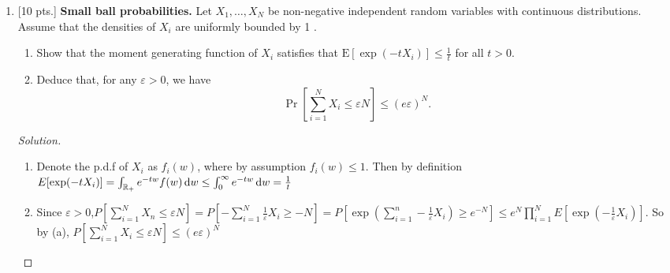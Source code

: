 \documentclass[12pt,letterpaper]{article}
\newenvironment{solution}{%
  \begin{proof}[Solution]$ $\par\nobreak\ignorespaces
}{%
  \end{proof}
}
\def \w{\boldsymbol{w}}
\def \x{\boldsymbol{x}}
\begin{document}
\begin{enumerate}
\begin{solution}
  Observe that
  \[\nm{\w_{(t+1)}}^{2}=\nm\{\w_{t}\}^{2}+2y_{t}\dual{\w_{t},\x_{t}}+\nm{x_{t}}^{2}\]
  So by selecting $\x_{t}\st \nm{x_{t}}=1,\dual{\w_{t},\x_{t}}$ (finding such a vector perpendicular to $\w_{t}$ is always possible as long as $d\geq 2$), then $\w_{t}$ grpws by exactly 1 at each iteration. In this way, (i)(ii) are satisfied.

\end{solution}

\item {[10 pts.]}  {\bf Small ball probabilities.} Let $X_{1}, \ldots, X_{N}$ be non-negative independent random variables with continuous distributions. Assume that the densities of $X_{i}$ are uniformly bounded by 1 .

\begin{enumerate}[label=(\alph*)]
    \item Show that the moment generating function of $X_{i}$ satisfies that $\mathrm{E} [\exp \left(-t X_{i}\right)] \leq \frac{1}{t}$ for all $t>0 .$
    
    \item Deduce that, for any $\varepsilon>0$, we have
$$
\Pr\left[\sum_{i=1}^{N} X_{i} \leq \varepsilon N\right] \leq(e \varepsilon)^{N} .
$$
\end{enumerate}

\begin{solution}
\begin{enumerate}[label=(\alph*)]
\item Denote the p.d.f of $X_{i}$ as $f_{i}(w)$, where by assumption $f_{i}(w)\leq 1$. Then by definition $E[\exp(-tX_{i})]=\int_{\mathbb{R}_{+}}e^{-tw}f(w)\,\mathrm{d} w\leq \int_{0}^{\infty}e^{-tw}\,\mathrm{d} w=\frac{1}{t}$
\item Since $\varepsilon>0$,$P[\sum_{i=1}^{N}X_{n}\leq \varepsilon N]=P[-\sum_{i=1}^{N}\frac{1}{\varepsilon}X_{i}\geq -N]=P[\exp(\sum_{i=1}^{n}-\frac{1}{\varepsilon}X_{i})\geq e^{-N}]\leq e^{N}\prod_{i=1}^{N}E[\exp(-\frac{1}{\varepsilon}X_{i})]$. So by (a), $P[\sum_{i=1}^{N}X_{i}\leq\varepsilon N]\leq (e\varepsilon)^{N}$
\end{enumerate}
\end{solution}



\end{enumerate}
\end{document}
